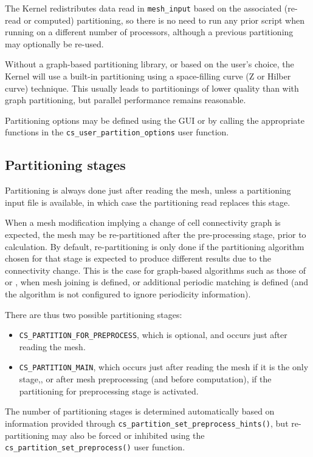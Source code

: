{{The Kernel redistributes data read in {\tt mesh\_input} based on the associated
(re-read or computed) partitioning, so there is no need to run any
prior script when running on a different number of processors, although
a previous partitioning may optionally be re-used.

Without a graph-based partitioning library, or based on the user's choice,
the Kernel will use a built-in partitioning using a space-filling curve
(Z or Hilber curve) technique. This usually leads to partitionings
of lower quality than with graph partitioning, but parallel
performance remains reasonable.

Partitioning options may be defined using the GUI or by calling
the appropriate functions in the
\texttt{cs\_user\_partition\_options} user function.

\subsection{Partitioning stages\label{sec:parall:part:stages}}

Partitioning is always done just after reading the mesh, unless a
partitioning input file is available, in which case the partitioning
read replaces this stage.

When a mesh modification implying a change of cell connectivity graph
is expected, the mesh may be re-partitioned after the pre-processing
stage, prior to calculation. By default, re-partitioning is only done
if the partitioning algorithm chosen for that stage is expected to
produce different results due to the connectivity change. This is
the case for graph-based algorithms such as those of \metis or \scotch,
when mesh joining is defined, or additional periodic matching is defined
(and the algorithm is not configured to ignore periodicity information).

There are thus two possible partitioning stages:

\begin{itemize}
\item \texttt{CS\_PARTITION\_FOR\_PREPROCESS}, which is optional, and
      occurs just  after reading the mesh.
\item \texttt{CS\_PARTITION\_MAIN}, which occurs just after reading the
      mesh if it is the only stage,, or after mesh preprocessing (and
      before computation), if the partitioning for preprocessing stage
      is activated.
\end{itemize}

The number of partitioning stages is determined automatically based on
information provided through \texttt{cs\_partition\_set\_preprocess\_hints()},
but re-partitioning may also be forced or inhibited using the
\texttt{cs\_partition\_set\_preprocess()} user function.

}}
